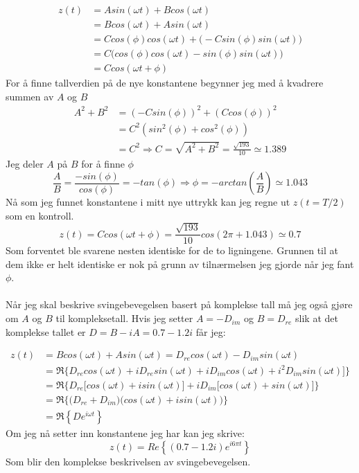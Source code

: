 \documentclass[a4paper,12pt,norsk]{article}
\begin{document}
\begin{align*}
z(t) &= Asin(\omega t) + Bcos(\omega t) \\
&= Bcos(\omega t) + Asin(\omega t) \\
&= Ccos(\phi)cos(\omega t) + \big(-Csin(\phi)sin(\omega t)\big)\\ 
&= C\big(cos(\phi)cos(\omega t) - sin(\phi)sin(\omega t)\big)\\
& = Ccos(\omega t + \phi)
\end{align*}
For å finne tallverdien på de nye konstantene begynner jeg med å kvadrere summen av $A$ og $B$
\begin{align*}
A^2+B^2 &= (-Csin(\phi))^2 + (Ccos(\phi))^2\\ 
&= C^2(sin^2(\phi)+cos^2(\phi)) \\
&= C^2 \Rightarrow C=\sqrt{A^2+B^2} = \frac{\sqrt{193}}{10} \simeq 1.389
\end{align*}
Jeg deler $A$ på $B$ for å finne $\phi$
$$
\frac{A}{B} = \frac{-sin(\phi)}{cos(\phi)} = -tan(\phi) \Rightarrow \phi = -arctan\left(\frac{A}{B}\right) \simeq 1.043
$$
Nå som jeg funnet konstantene i mitt nye uttrykk kan jeg regne ut $z(t=T/2)$ som en kontroll.
$$
z(t) = Ccos(\omega t + \phi) = \frac{\sqrt{193}}{10}cos(2\pi + 1.043) \simeq 0.7
$$
Som forventet ble svarene nesten identiske for de to ligningene. Grunnen til at dem ikke er helt identiske er nok på grunn av tilnærmelsen jeg gjorde når jeg fant $\phi$.
\\ \\
Når jeg skal beskrive svingebevegelsen basert på komplekse tall må jeg også gjøre om $A$ og $B$ til kompleksetall. Hvis jeg setter $A = -D_{im}$ og $B = D_{re}$ slik at det komplekse tallet er $D = B - iA = 0.7 - 1.2i$ får jeg:

\begin{align*}
z(t) &= Bcos(\omega t) + Asin(\omega t) = D_{re}cos(\omega t) - D_{im}sin(\omega t)\\
&= \Re \Big\{D_{re}cos(\omega t) + iD_{re}sin(\omega t) + iD_{im}cos(\omega t) + i^2D_{im}sin(\omega t)\big]\Big\} \\
&= \Re \Big\{D_{re}\big[cos(\omega t) + isin(\omega t)\big] + iD_{im}\big[cos(\omega t) + sin(\omega t)\big]\Big\} \\
&= \Re \Big\{ \big( D_{re}+D_{im}\big) \big(cos(\omega t) + isin(\omega t) \big) \Big\} \\
&= \Re \left\{De^{i\omega t} \right\}
\end{align*}
Om jeg nå setter inn konstantene jeg har kan jeg skrive:
$$
z(t) =Re\left\{ (0.7 - 1.2i)e^{i6\pi t}\right\}
$$
Som blir den komplekse beskrivelsen av svingebevegelsen.
\end{document}
